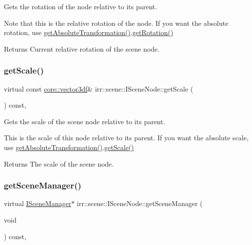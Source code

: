Gets the rotation of the node relative to its parent. 

Note that this is the relative rotation of the node. If you want the absolute rotation, use \hyperlink{classirr_1_1scene_1_1ISceneNode_af13dc546a7be796cc0868a2eec51e508}{get\+Absolute\+Transformation()}.\hyperlink{classirr_1_1scene_1_1ISceneNode_acfef9f174e2398b479915791e4084061}{get\+Rotation()} \begin{DoxyReturn}{Returns}
Current relative rotation of the scene node. 
\end{DoxyReturn}
\mbox{\label{classirr_1_1scene_1_1ISceneNode_a97a5963f8b7b3cdf6fa196863c641c1d}} 
\subsubsection{\texorpdfstring{get\+Scale()}{getScale()}}
{\footnotesize\ttfamily virtual const \hyperlink{namespaceirr_1_1core_a06f169d08b5c429f5575acb7edbad811}{core\+::vector3df}\& irr\+::scene\+::\+I\+Scene\+Node\+::get\+Scale (\begin{DoxyParamCaption}{ }\end{DoxyParamCaption}) const\hspace{0.3cm}{\ttfamily [inline]}, {\ttfamily [virtual]}}



Gets the scale of the scene node relative to its parent. 

This is the scale of this node relative to its parent. If you want the absolute scale, use \hyperlink{classirr_1_1scene_1_1ISceneNode_af13dc546a7be796cc0868a2eec51e508}{get\+Absolute\+Transformation()}.\hyperlink{classirr_1_1scene_1_1ISceneNode_a97a5963f8b7b3cdf6fa196863c641c1d}{get\+Scale()} \begin{DoxyReturn}{Returns}
The scale of the scene node. 
\end{DoxyReturn}
\mbox{\label{classirr_1_1scene_1_1ISceneNode_a394f112e9b4a1c66f7d58e873a3f8a1d}} 
\subsubsection{\texorpdfstring{get\+Scene\+Manager()}{getSceneManager()}}
{\footnotesize\ttfamily virtual \hyperlink{classirr_1_1scene_1_1ISceneManager}{I\+Scene\+Manager}$\ast$ irr\+::scene\+::\+I\+Scene\+Node\+::get\+Scene\+Manager (\begin{DoxyParamCaption}\item[{void}]{ }\end{DoxyParamCaption}) const\hspace{0.3cm}{\ttfamily [inline]}, {\ttfamily [virtual]}}



